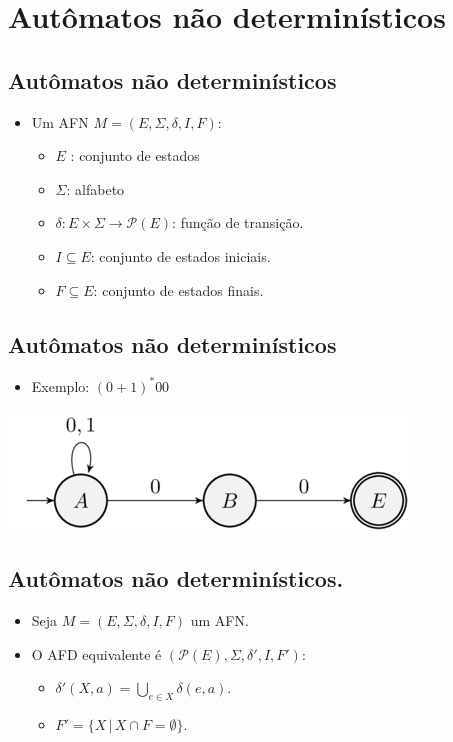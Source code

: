 \documentclass[11pt]{article}
\begin{document}
\section*{Autômatos não determinísticos}
\label{sec:org0b2ab18}

\subsection*{Autômatos não determinísticos}
\label{sec:org188a81f}

\begin{itemize}
\item Um AFN \(M=(E,\Sigma,\delta,I,F)\):
\begin{itemize}
\item \(E\) : conjunto de estados
\item \(\Sigma\): alfabeto
\item \(\delta : E\times\Sigma\to\mathcal{P}(E)\): função de transição.
\item \(I \subseteq E\): conjunto de estados iniciais.
\item \(F\subseteq E\): conjunto de estados finais.
\end{itemize}
\end{itemize}
\subsection*{Autômatos não determinísticos}
\label{sec:org70d41af}

\begin{itemize}
\item Exemplo: \((0+1)^*00\)
\end{itemize}

\begin{center}
\includegraphics[width=.9\linewidth]{./imgs/image7.png}
\end{center}
\subsection*{Autômatos não determinísticos.}
\label{sec:org8c7307c}

\begin{itemize}
\item Seja \(M=(E,\Sigma,\delta,I,F)\) um AFN.

\item O AFD equivalente é \((\mathcal{P}(E),\Sigma,\delta',I, F')\):
\begin{itemize}
\item \(\delta'(X,a) = \bigcup_{e\in X}\delta(e,a)\).
\item \(F' = \{X\,|\, X \cap F = \emptyset\}\).
\end{itemize}
\end{itemize}
\end{document}
